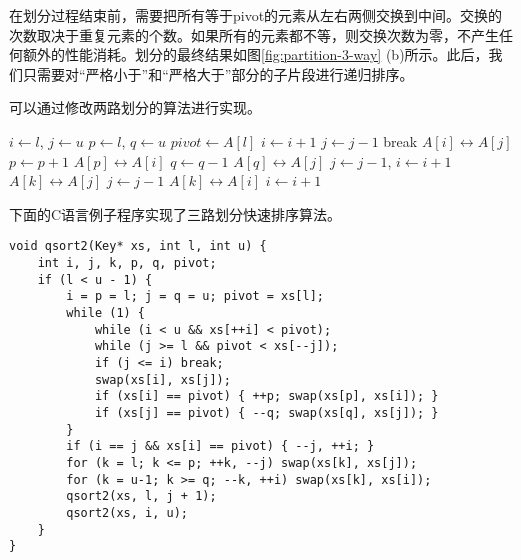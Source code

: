 \documentclass{ctexart}
\begin{document}
在划分过程结束前，需要把所有等于pivot的元素从左右两侧交换到中间。交换的次数取决于重复元素的个数。如果所有的元素都不等，则交换次数为零，不产生任何额外的性能消耗。划分的最终结果如图\ref{fig:partition-3-way} (b)所示。此后，我们只需要对“严格小于”和“严格大于”部分的子片段进行递归排序。

可以通过修改两路划分的算法进行实现。

\begin{algorithmic}[1]
    \State $i \gets l$, $j \gets u$
    \State $p \gets l$, $q \gets u$ 
    \State $pivot \gets A[l]$
    \Loop
      \Repeat
        \State $i \gets i + 1$
       
      \Repeat
        \State $j \gets j - 1$
       
        \State break 
      \EndIf
      \State {} $A[i] \leftrightarrow A[j]$
       
        \State $p \gets p + 1$
        \State {} $A[p] \leftrightarrow A[i]$
      \EndIf
        \State $q \gets q - 1$
        \State {} $A[q] \leftrightarrow A[j]$
      \EndIf
    \EndLoop
     
      \State $j \gets j - 1$, $i \gets i + 1$
    \EndIf
     
      \State {} $A[k] \leftrightarrow A[j]$
      \State $j \gets j - 1$
    \EndFor
      \State {} $A[k] \leftrightarrow A[i]$
      \State $i \gets i + 1$
    \EndFor
    \State {}
    \State {}
  \EndIf
\EndProcedure
\end{algorithmic}

下面的C语言例子程序实现了三路划分快速排序算法。

\lstset{language=C}
\begin{lstlisting}
void qsort2(Key* xs, int l, int u) {
    int i, j, k, p, q, pivot;
    if (l < u - 1) {
        i = p = l; j = q = u; pivot = xs[l];
        while (1) {
            while (i < u && xs[++i] < pivot);
            while (j >= l && pivot < xs[--j]);
            if (j <= i) break;
            swap(xs[i], xs[j]);
            if (xs[i] == pivot) { ++p; swap(xs[p], xs[i]); }
            if (xs[j] == pivot) { --q; swap(xs[q], xs[j]); }
        }
        if (i == j && xs[i] == pivot) { --j, ++i; }
        for (k = l; k <= p; ++k, --j) swap(xs[k], xs[j]);
        for (k = u-1; k >= q; --k, ++i) swap(xs[k], xs[i]);
        qsort2(xs, l, j + 1);
        qsort2(xs, i, u);
    }
}
\end{lstlisting}
\end{document}

